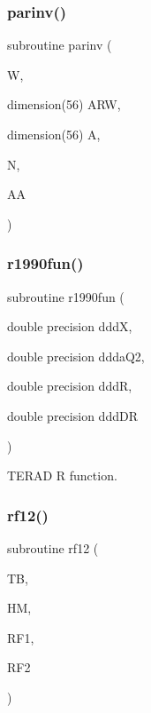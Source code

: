 \subsubsection{\texorpdfstring{parinv()}{parinv()}}
{\footnotesize\ttfamily subroutine parinv (\begin{DoxyParamCaption}\item[{}]{W,  }\item[{dimension(56)}]{A\+RW,  }\item[{dimension(56)}]{A,  }\item[{}]{N,  }\item[{}]{AA }\end{DoxyParamCaption})}

\mbox{\label{djangoh__h_8f_a93ed5d17e768db4d2ddb8961a2cb6f19}} 
\subsubsection{\texorpdfstring{r1990fun()}{r1990fun()}}
{\footnotesize\ttfamily subroutine r1990fun (\begin{DoxyParamCaption}\item[{double precision}]{dddX,  }\item[{double precision}]{ddda\+Q2,  }\item[{double precision}]{dddR,  }\item[{double precision}]{ddd\+DR }\end{DoxyParamCaption})}



T\+E\+R\+AD R function. 

\mbox{\label{djangoh__h_8f_adc612a6379fe2bea9d4fc9539ea755fc}} 
\subsubsection{\texorpdfstring{rf12()}{rf12()}}
{\footnotesize\ttfamily subroutine rf12 (\begin{DoxyParamCaption}\item[{}]{TB,  }\item[{}]{HM,  }\item[{}]{R\+F1,  }\item[{}]{R\+F2 }\end{DoxyParamCaption})}


